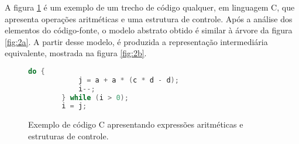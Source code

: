 \documentclass[
	12pt,				%
	openright,			%
	oneside,			%
	a4paper,			%
	tccpreliminar,			%
	]{ABNT-DC-UEL}
\begin{document}
A figura \ref{fig:1} é um exemplo de um trecho de código qualquer, em linguagem C, que apresenta operações aritméticas e uma estrutura de controle. Após a análise dos elementos do código-fonte, o modelo abstrato obtido é similar à árvore da figura \ref{fig:2a}. A partir desse modelo, é produzida a representação intermediária equivalente, mostrada na figura \ref{fig:2b}.

\begin{figure}[ht]
    \centering
    
    \begin{lstlisting}[language=c, frame=single]
        do {
            j = a + a * (c * d - d);
            i--;
        } while (i > 0);
        i = j;
    \end{lstlisting}
    \caption{Exemplo de código C apresentando expressões aritméticas e estruturas de controle.}
    \label{fig:1}
\end{figure}
\end{document}
